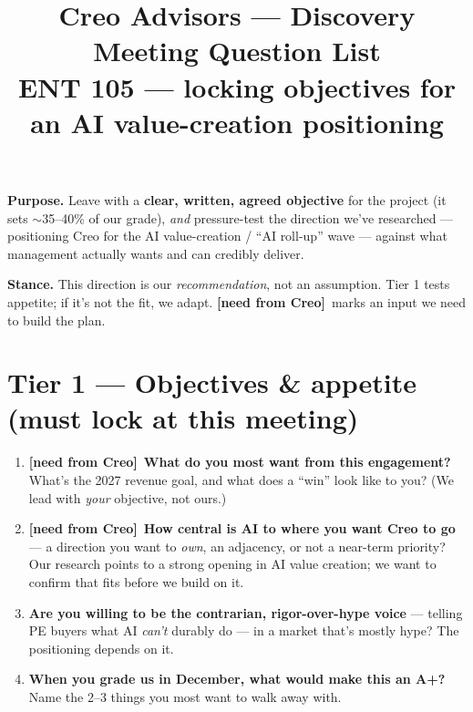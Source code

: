 \documentclass[11pt]{article}
\title{\textbf{Creo Advisors --- Discovery Meeting Question List}\\[3pt]
\large ENT 105 --- locking objectives for an AI value-creation positioning}
\author{}
\date{}
\newcommand{\gap}{\textcolor{orange!85!black}{\textbf{[need from Creo]}}~}
\begin{document}
\maketitle
\vspace{-2.5em}

\begin{callout}
\textbf{Purpose.} Leave with a \textbf{clear, written, agreed objective} for the project (it
sets $\sim$35--40\% of our grade), \emph{and} pressure-test the direction we've researched ---
positioning Creo for the AI value-creation / ``AI roll-up'' wave --- against what management
actually wants and can credibly deliver.

\smallskip
\textbf{Stance.} This direction is our \emph{recommendation}, not an assumption. Tier 1 tests
appetite; if it's not the fit, we adapt. \gap marks an input we need to build the plan.
\end{callout}

\section{Tier 1 --- Objectives \& appetite (must lock at this meeting)}
\begin{enumerate}
  \item \gap\textbf{What do you most want from this engagement?} What's the 2027 revenue goal,
  and what does a ``win'' look like to you? (We lead with \emph{your} objective, not ours.)
  \item \gap\textbf{How central is AI to where you want Creo to go} --- a direction you want to
  \emph{own}, an adjacency, or not a near-term priority? Our research points to a strong opening
  in AI value creation; we want to confirm that fits before we build on it.
  \item \textbf{Are you willing to be the contrarian, rigor-over-hype voice} --- telling PE
  buyers what AI \emph{can't} durably do --- in a market that's mostly hype? The positioning
  depends on it.
  \item \textbf{When you grade us in December, what would make this an A+?} Name the 2--3 things
  you most want to walk away with.
\end{enumerate}

\end{document}
